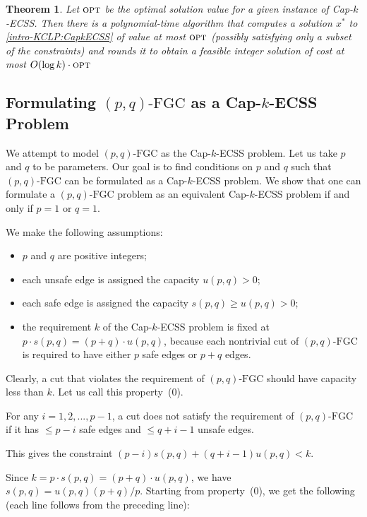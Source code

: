 \documentclass[11pt]{article}
\newtheorem{theorem}{Theorem}
\newcommand{\opt}{\textsc{opt}}
\newcommand{\fgc}{\mathrm{FGC}}
\newcommand{\pqfgc}{(p,q)\text{-}\fgc}
\begin{document}
{\begin{theorem} \label{thm:approx-CapkECSS}
Let $\opt$ be the optimal solution value for a given instance of Cap-$k$-ECSS. Then there is a polynomial-time algorithm that computes a solution $x^*$ to \eqref{intro-KCLP:CapkECSS} of value at most $\opt$ (possibly satisfying only a subset of the constraints) and rounds it to obtain a feasible integer solution of cost at most $O(\log k) \cdot \opt$
\end{theorem}

}

\clearpage

\begin{appendices}
\section{Formulating $\pqfgc$ as a Cap-$k$-ECSS Problem \label{sec:A1:pqfgc}}
{
We attempt to model $\pqfgc$ as the Cap-$k$-ECSS problem.
Let us take $p$ and $q$ to be parameters.
Our goal is to find conditions on $p$ and $q$ such that $\pqfgc$
can be formulated as a Cap-$k$-ECSS problem.
We show that one can formulate a $\pqfgc$ problem as an equivalent
Cap-$k$-ECSS problem if and only if $p=1$ or $q=1$.

We make the following assumptions:

\begin{itemize}
\item
$p$ and $q$ are positive integers;
\item
each unsafe edge is assigned the capacity $u(p,q)>0$;
\item
each safe edge is assigned the capacity $s(p,q)\geq u(p,q)>0$;
\item
the requirement $k$ of the Cap-$k$-ECSS problem is fixed at
$p \cdot s(p,q) = (p+q) \cdot u(p,q)$, because each nontrivial cut
of $\pqfgc$ is required to have either $p$ safe edges or $p+q$ edges.
\end{itemize}

Clearly, a cut that violates the requirement of $\pqfgc$ should
have capacity less than $k$.
Let us call this property~(0).

For any $i = 1,2,...,p-1$, a cut does not satisfy the requirement
of $\pqfgc$ if it has $\leq p-i$ safe edges and $\leq q+i-1$ unsafe edges.

This gives the constraint $(p-i)s(p,q) + (q+i-1)u(p,q) < k$.

Since $k = p\cdot s(p,q) = (p+q)\cdot u(p,q)$, we have  $s(p,q) =
u(p,q)(p+q)/p$. Starting from property~(0), we get the following
(each line follows from the preceding line):

}
\end{appendices}
\end{document}
